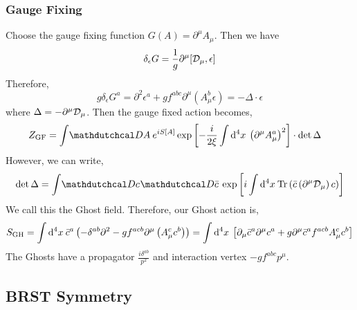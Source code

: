 \documentclass[12pt]{extarticle}
\begin{document}
\subsubsection{Gauge Fixing}

Choose the gauge fixing function $G(A) = \partial^\mu A_\mu$. Then we have
\[ \delta_{\epsilon} G = \frac{1}{g} \partial^\mu [\mathcal{D}_\mu, \epsilon ] \]
Therefore,
\[ g \delta_{\epsilon} G^a = \partial^2 \epsilon^a 
+ g f^{abc} \partial^\mu \left( A^b_\mu \epsilon \right) = - \Delta \cdot \epsilon \]
where $\Delta = - \partial^\mu \mathcal{D}_\mu$. 
Then the gauge fixed action becomes,
\begin{align*}
Z_{\mathrm{GF}} & = \int \pathd{A} e^{iS[A]} \exp{\left[-\frac{i}{2 \xi} \int \dn{4}{x} \left( \partial^\mu A_\mu^a \right)^2 \right]} \cdot \det{\Delta} 
\end{align*}
However, we can write,
\[ \det{\Delta} = \int \pathd{c} \pathd{\bar{c}} \exp{\left[i \int \dn{4}{x} \Tr{\bar{c} \left( \partial^\mu \covD_\mu \right) c}\right]} \]
We call this the Ghost field. Therefore, our Ghost action is,
\[ S_{\mathrm{GH}} = \int \mathrm{d}^{4} x \: \bar{c}^a \left( - \delta^{ab} \partial^2 - g f^{acb} \partial^\mu \left( A^c_\mu c^b \right) \right) = \int \mathrm{d}^{4} x \: \left[ \partial_\mu \bar{c}^a \partial^\mu c^a + g \partial^\mu \bar{c}^a f^{acb} A^c_\mu c^b \right] \]
The Ghosts have a propagator $\frac{i \delta^{ab}}{p^2}$ and interaction vertex $-g f^{abc} p^\mu$. 

\subsection{BRST Symmetry}
\end{document}
